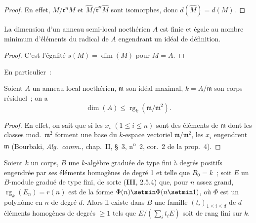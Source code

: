 
\begin{proof}
En effet, $M/\mathfrak{r}^nM$ et
$\widehat{M}/\widehat{\mathfrak{r}}^n\widehat{M}$ sont isomorphes, donc
$d(\widehat{M})=d(M)$.
\end{proof}

\begin{corollary}[16.2.5]
\label{0.16.2.5-fr}
La dimension d'un anneau semi-local noethérien $A$ est finie et égale au
nombre minimum d'éléments du radical de $A$ engendrant un idéal de définition.
\end{corollary}

\begin{proof}
C'est l'égalité $s(M)=\dim(M)$ pour $M=A$.
\end{proof}

En particulier~:

\begin{corollary}[16.2.6]
\label{0.16.2.6-fr}
Soient $A$ un anneau local noethérien, $\mathfrak{m}$ son idéal maximal,
$k=A/\mathfrak{m}$ son corps résiduel~; on a
\begin{equation}
\label{0.16.2.6.1-fr}
\tag{16.2.6.1}
  \dim(A)\leq\operatorname{rg}_k(\mathfrak{m}/\mathfrak{m}^2).
\end{equation}
\end{corollary}

\begin{proof}
En effet, on sait que si les $x_i$ $(1\leq i\leq n)$ sont des éléments de
$\mathfrak{m}$ dont les classes mod.~$\mathfrak{m}^2$ forment une base du
$k$-espace vectoriel $\mathfrak{m}/\mathfrak{m}^2$, les $x_i$ engendrent
$\mathfrak{m}$ (Bourbaki, \emph{Alg.~comm.}, chap.~II, \S~3, n\textsuperscript{o}~2, cor.~2 de
la prop.~4).
\end{proof}

\begin{proposition}[16.2.7]
\label{0.16.2.7-fr}
Soient $k$ un corps, $B$ une $k$-algèbre graduée de type fini à degrés
positifs engendrée par ses éléments homogènes de degré 1 et telle que $B_0=k$~;
soit $E$ un $B$-module gradué de type fini, de sorte \textup{(\textbf{III}, 2.5.4)} que, pour $n$
assez grand, $\operatorname{rg}_k(E_n)=r(n)$ est de la forme
$\Phi(n)\setmin\Phi(n\setmin 1)$, où $\Phi$ est un polynôme en $n$ de degré $d$. Alors il
existe dans $B$ une famille $(t_i)_{1\leq i\leq d}$ de $d$ éléments homogènes
de degrés $\geq1$ tels que $E/(\sum_i t_iE)$ soit de rang fini sur $k$.
\end{proposition}

